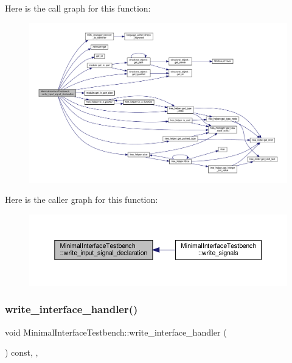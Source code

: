 Here is the call graph for this function\+:
\nopagebreak
\begin{figure}[H]
\begin{center}
\leavevmode
\includegraphics[width=350pt]{d0/dba/classMinimalInterfaceTestbench_ad98da27cdbef628638bae4f61ce36cc7_cgraph}
\end{center}
\end{figure}
Here is the caller graph for this function\+:
\nopagebreak
\begin{figure}[H]
\begin{center}
\leavevmode
\includegraphics[width=350pt]{d0/dba/classMinimalInterfaceTestbench_ad98da27cdbef628638bae4f61ce36cc7_icgraph}
\end{center}
\end{figure}
\mbox{\label{classMinimalInterfaceTestbench_ab1139a5ae11ad46d2be19713199cb9e1}} 
\subsubsection{\texorpdfstring{write\+\_\+interface\+\_\+handler()}{write\_interface\_handler()}}
{\footnotesize\ttfamily void Minimal\+Interface\+Testbench\+::write\+\_\+interface\+\_\+handler (\begin{DoxyParamCaption}{ }\end{DoxyParamCaption}) const\hspace{0.3cm}{\ttfamily [override]}, {\ttfamily [protected]}, {\ttfamily [virtual]}}

